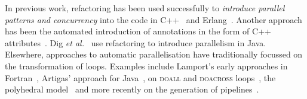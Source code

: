 \documentclass[a4paper,11pt]{article}
\begin{document}
In previous work, refactoring has been used successfully to \emph{introduce parallel patterns and concurrency} into the code in C++~\cite{brownagricultural,DBLP:conf/pdp/JanjicBMHDAG16, grppirefactoring, mcts} and Erlang~\cite{hlpp,DBLP:journals/cai/BarwellBHTB16}. Another approach
has been the automated introduction of annotations in the form of
C++ attributes~\cite{rio:2018}. Dig \textit{et al.}~\cite{dig} use refactoring to introduce parallelism in Java.  
%
%
%
Elsewhere, approaches to automatic parallelisation have traditionally focussed on the transformation of loops. Examples include Lamport's early approaches in Fortran~\cite{DBLP:journals/cacm/Lamport74}, Artigas' approach for Java~\cite{kennedy}, on \textsc{doall} and \textsc{doacross} loops~\cite{DBLP:conf/pldi/BurkeC86,DBLP:conf/popl/LimL97}, the polyhedral model~\cite{DBLP:conf/ppopp/AncourtI91,DBLP:conf/IEEEpact/Bastoul04,DBLP:conf/IEEEpact/BouletF98} and more recently on the generation of pipelines~\cite{DBLP:conf/IEEEpact/TournavitisF10,DBLP:journals/taco/WangTFO14}. 
%
\end{document}
